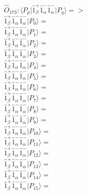 \documentclass[14pt]{article}
\begin{document}
    $\hat{O}_{173}:  \langle{P_p}\vert \hat{1}_{\beta}^{+}\hat{1}_{\alpha}^{-}\hat{1}_{\alpha}^{-} \vert{P_q}\rangle => $ \\ 
    $ \hat{1}_{\beta}^{+}\hat{1}_{\alpha}^{-}\hat{1}_{\alpha}^{-} \vert{P_{0}}\rangle =  $ \\ 
    $ \hat{1}_{\beta}^{+}\hat{1}_{\alpha}^{-}\hat{1}_{\alpha}^{-} \vert{P_{1}}\rangle =  $ \\ 
    $ \hat{1}_{\beta}^{+}\hat{1}_{\alpha}^{-}\hat{1}_{\alpha}^{-} \vert{P_{2}}\rangle =  $ \\ 
    $ \hat{1}_{\beta}^{+}\hat{1}_{\alpha}^{-}\hat{1}_{\alpha}^{-} \vert{P_{3}}\rangle =  $ \\ 
    $ \hat{1}_{\beta}^{+}\hat{1}_{\alpha}^{-}\hat{1}_{\alpha}^{-} \vert{P_{4}}\rangle =  $ \\ 
    $ \hat{1}_{\beta}^{+}\hat{1}_{\alpha}^{-}\hat{1}_{\alpha}^{-} \vert{P_{5}}\rangle =  $ \\ 
    $ \hat{1}_{\beta}^{+}\hat{1}_{\alpha}^{-}\hat{1}_{\alpha}^{-} \vert{P_{6}}\rangle =  $ \\ 
    $ \hat{1}_{\beta}^{+}\hat{1}_{\alpha}^{-}\hat{1}_{\alpha}^{-} \vert{P_{7}}\rangle =  $ \\ 
    $ \hat{1}_{\beta}^{+}\hat{1}_{\alpha}^{-}\hat{1}_{\alpha}^{-} \vert{P_{8}}\rangle =  $ \\ 
    $ \hat{1}_{\beta}^{+}\hat{1}_{\alpha}^{-}\hat{1}_{\alpha}^{-} \vert{P_{9}}\rangle =  $ \\ 
    $ \hat{1}_{\beta}^{+}\hat{1}_{\alpha}^{-}\hat{1}_{\alpha}^{-} \vert{P_{10}}\rangle =  $ \\ 
    $ \hat{1}_{\beta}^{+}\hat{1}_{\alpha}^{-}\hat{1}_{\alpha}^{-} \vert{P_{11}}\rangle =  $ \\ 
    $ \hat{1}_{\beta}^{+}\hat{1}_{\alpha}^{-}\hat{1}_{\alpha}^{-} \vert{P_{12}}\rangle =  $ \\ 
    $ \hat{1}_{\beta}^{+}\hat{1}_{\alpha}^{-}\hat{1}_{\alpha}^{-} \vert{P_{13}}\rangle =  $ \\ 
    $ \hat{1}_{\beta}^{+}\hat{1}_{\alpha}^{-}\hat{1}_{\alpha}^{-} \vert{P_{14}}\rangle =  $ \\ 
    $ \hat{1}_{\beta}^{+}\hat{1}_{\alpha}^{-}\hat{1}_{\alpha}^{-} \vert{P_{15}}\rangle =  $ \\ 
    
\end{document}
